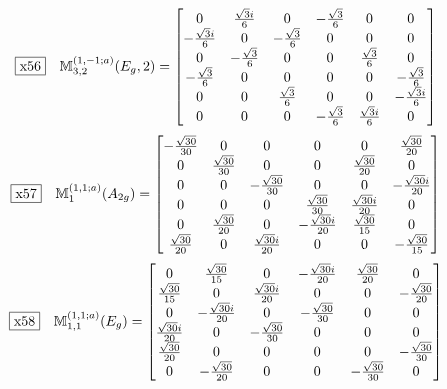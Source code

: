 \documentclass[fleqn,10pt,landscape]{jsarticle}
\begin{document}
\begin{dmath*}
\fbox{x56}\quad \mathbb{M}_{3,2}^{(1,-1;a)}(E_{g},2)=\begin{bmatrix} 0 & \frac{\sqrt{3} i}{6} & 0 & - \frac{\sqrt{3}}{6} & 0 & 0 \\ - \frac{\sqrt{3} i}{6} & 0 & - \frac{\sqrt{3}}{6} & 0 & 0 & 0 \\ 0 & - \frac{\sqrt{3}}{6} & 0 & 0 & \frac{\sqrt{3}}{6} & 0 \\ - \frac{\sqrt{3}}{6} & 0 & 0 & 0 & 0 & - \frac{\sqrt{3}}{6} \\ 0 & 0 & \frac{\sqrt{3}}{6} & 0 & 0 & - \frac{\sqrt{3} i}{6} \\ 0 & 0 & 0 & - \frac{\sqrt{3}}{6} & \frac{\sqrt{3} i}{6} & 0 \end{bmatrix}
\end{dmath*}
\begin{dmath*}
\fbox{x57}\quad \mathbb{M}_{1}^{(1,1;a)}(A_{2g})=\begin{bmatrix} - \frac{\sqrt{30}}{30} & 0 & 0 & 0 & 0 & \frac{\sqrt{30}}{20} \\ 0 & \frac{\sqrt{30}}{30} & 0 & 0 & \frac{\sqrt{30}}{20} & 0 \\ 0 & 0 & - \frac{\sqrt{30}}{30} & 0 & 0 & - \frac{\sqrt{30} i}{20} \\ 0 & 0 & 0 & \frac{\sqrt{30}}{30} & \frac{\sqrt{30} i}{20} & 0 \\ 0 & \frac{\sqrt{30}}{20} & 0 & - \frac{\sqrt{30} i}{20} & \frac{\sqrt{30}}{15} & 0 \\ \frac{\sqrt{30}}{20} & 0 & \frac{\sqrt{30} i}{20} & 0 & 0 & - \frac{\sqrt{30}}{15} \end{bmatrix}
\end{dmath*}
\begin{dmath*}
\fbox{x58}\quad \mathbb{M}_{1,1}^{(1,1;a)}(E_{g})=\begin{bmatrix} 0 & \frac{\sqrt{30}}{15} & 0 & - \frac{\sqrt{30} i}{20} & \frac{\sqrt{30}}{20} & 0 \\ \frac{\sqrt{30}}{15} & 0 & \frac{\sqrt{30} i}{20} & 0 & 0 & - \frac{\sqrt{30}}{20} \\ 0 & - \frac{\sqrt{30} i}{20} & 0 & - \frac{\sqrt{30}}{30} & 0 & 0 \\ \frac{\sqrt{30} i}{20} & 0 & - \frac{\sqrt{30}}{30} & 0 & 0 & 0 \\ \frac{\sqrt{30}}{20} & 0 & 0 & 0 & 0 & - \frac{\sqrt{30}}{30} \\ 0 & - \frac{\sqrt{30}}{20} & 0 & 0 & - \frac{\sqrt{30}}{30} & 0 \end{bmatrix}
\end{dmath*}
\end{document}
